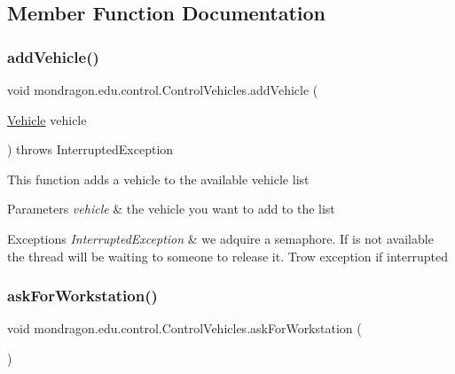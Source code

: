 \subsection{Member Function Documentation}
\mbox{\label{classmondragon_1_1edu_1_1control_1_1_control_vehicles_afd9646551c40268a5fcf20153df94da5}} 
\subsubsection{\texorpdfstring{addVehicle()}{addVehicle()}}
{\footnotesize\ttfamily void mondragon.\+edu.\+control.\+Control\+Vehicles.\+add\+Vehicle (\begin{DoxyParamCaption}\item[{\mbox{\hyperlink{classmondragon_1_1edu_1_1clases_1_1_vehicle}{Vehicle}}}]{vehicle }\end{DoxyParamCaption}) throws Interrupted\+Exception\hspace{0.3cm}{\ttfamily [inline]}}

This function adds a vehicle to the available vehicle list


\begin{DoxyParams}{Parameters}
{\em vehicle} & the vehicle you want to add to the list \\
\hline
\end{DoxyParams}

\begin{DoxyExceptions}{Exceptions}
{\em Interrupted\+Exception} & we adquire a semaphore. If is not available the thread will be waiting to someone to release it. Trow exception if interrupted \\
\hline
\end{DoxyExceptions}
\mbox{\label{classmondragon_1_1edu_1_1control_1_1_control_vehicles_a63aa6c69adc18b9af382fdcc7ae088ec}} 
\subsubsection{\texorpdfstring{askForWorkstation()}{askForWorkstation()}}
{\footnotesize\ttfamily void mondragon.\+edu.\+control.\+Control\+Vehicles.\+ask\+For\+Workstation (\begin{DoxyParamCaption}{ }\end{DoxyParamCaption})\hspace{0.3cm}{\ttfamily [inline]}}

